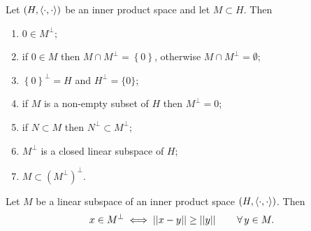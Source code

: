 \documentclass{article}
\begin{document}
\begin{proposition}
	Let $\left(H,\langle \cdot,\cdot \rangle\right)$ be an inner product space and let $M\subset H$. Then
	\begin{enumerate}
		\item $0\in M^{\perp}$;
		\item if $0\in M$ then $M\cap M^{\perp}=\left\{0\right\}$, otherwise $M\cap M^{\perp}=\emptyset$;
		\item $\left\{0\right\}^{\perp}=H$ and $H^{\perp}=\{0\}$;
		\item if $M$ is a non-empty subset of $H$ then $M^{\perp}=0$;
		\item if $N\subset M$ then $N^{\perp}\subset M^{\perp}$;
		\item $M^{\perp}$ is a closed linear subspace of $H$;
		\item $M\subset\left(M^{\perp}\right)^{\perp}$.
	\end{enumerate}
\end{proposition}
\begin{proposition}
	Let $M$ be a linear subspace of an inner product space $\left(H,\langle \cdot,\cdot \rangle\right)$. Then
	\begin{equation*}
		x\in M^{\perp}\iff\left|\left|x-y\right|\right|\geq\left|\left|y\right|\right|\qquad\forall\, y\in M.
	\end{equation*}
\end{proposition}
\end{document}
